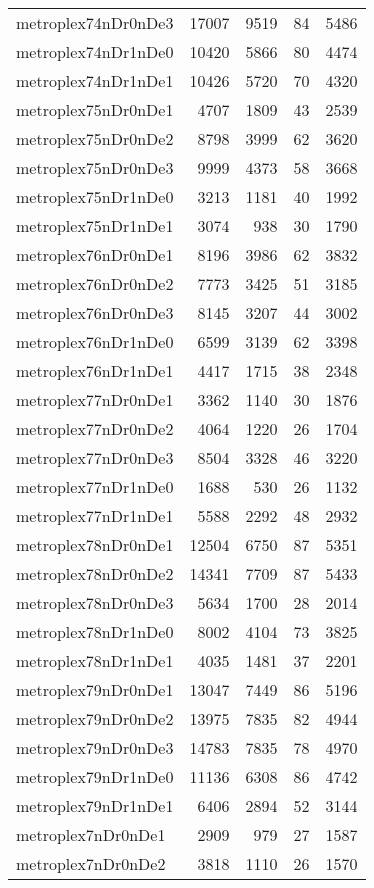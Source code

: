\begin{longtable}{lrrrr}
metroplex74nDr0nDe3 & 17007 & 9519 & 84 & 5486 \\
metroplex74nDr1nDe0 & 10420 & 5866 & 80 & 4474 \\
metroplex74nDr1nDe1 & 10426 & 5720 & 70 & 4320 \\
metroplex75nDr0nDe1 & 4707 & 1809 & 43 & 2539 \\
metroplex75nDr0nDe2 & 8798 & 3999 & 62 & 3620 \\
metroplex75nDr0nDe3 & 9999 & 4373 & 58 & 3668 \\
metroplex75nDr1nDe0 & 3213 & 1181 & 40 & 1992 \\
metroplex75nDr1nDe1 & 3074 & 938 & 30 & 1790 \\
metroplex76nDr0nDe1 & 8196 & 3986 & 62 & 3832 \\
metroplex76nDr0nDe2 & 7773 & 3425 & 51 & 3185 \\
metroplex76nDr0nDe3 & 8145 & 3207 & 44 & 3002 \\
metroplex76nDr1nDe0 & 6599 & 3139 & 62 & 3398 \\
metroplex76nDr1nDe1 & 4417 & 1715 & 38 & 2348 \\
metroplex77nDr0nDe1 & 3362 & 1140 & 30 & 1876 \\
metroplex77nDr0nDe2 & 4064 & 1220 & 26 & 1704 \\
metroplex77nDr0nDe3 & 8504 & 3328 & 46 & 3220 \\
metroplex77nDr1nDe0 & 1688 & 530 & 26 & 1132 \\
metroplex77nDr1nDe1 & 5588 & 2292 & 48 & 2932 \\
metroplex78nDr0nDe1 & 12504 & 6750 & 87 & 5351 \\
metroplex78nDr0nDe2 & 14341 & 7709 & 87 & 5433 \\
metroplex78nDr0nDe3 & 5634 & 1700 & 28 & 2014 \\
metroplex78nDr1nDe0 & 8002 & 4104 & 73 & 3825 \\
metroplex78nDr1nDe1 & 4035 & 1481 & 37 & 2201 \\
metroplex79nDr0nDe1 & 13047 & 7449 & 86 & 5196 \\
metroplex79nDr0nDe2 & 13975 & 7835 & 82 & 4944 \\
metroplex79nDr0nDe3 & 14783 & 7835 & 78 & 4970 \\
metroplex79nDr1nDe0 & 11136 & 6308 & 86 & 4742 \\
metroplex79nDr1nDe1 & 6406 & 2894 & 52 & 3144 \\
metroplex7nDr0nDe1 & 2909 & 979 & 27 & 1587 \\
metroplex7nDr0nDe2 & 3818 & 1110 & 26 & 1570 \\

\end{longtable}
